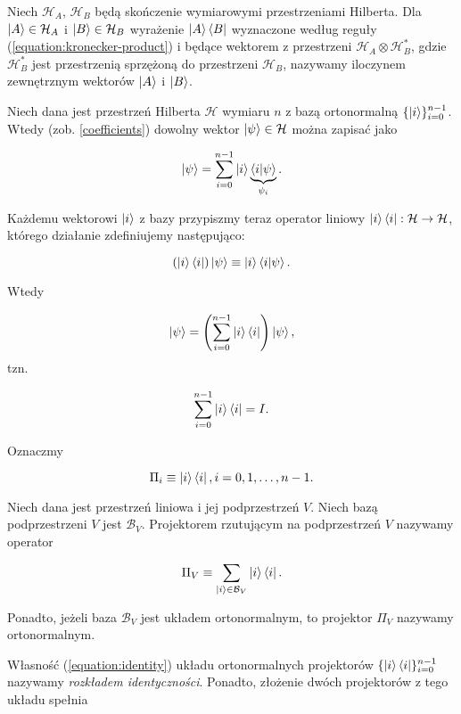 \begin{definition}
    Niech $\mathcal{H}_{A}$, $\mathcal{H}_{B}$ będą skończenie wymiarowymi przestrzeniami Hilberta. Dla $\ket{A} \in \mathcal{H}_A$ i $\ket{B} \in \mathcal{H}_B$ wyrażenie $\ket{A} \bra{B}$ wyznaczone według reguły (\ref{equation:kronecker-product}) i będące wektorem z przestrzeni $\mathcal{H}_A \otimes \mathcal{H}_{B} ^ {*}$, gdzie $\mathcal{H}_{B} ^ {*}$ jest przestrzenią sprzężoną do przestrzeni $\mathcal{H}_B$, nazywamy iloczynem zewnętrznym wektorów $\ket{A}$ i $\ket{B}$.
\end{definition}

Niech dana jest przestrzeń Hilberta $\mathcal{H}$ wymiaru $n$ z bazą ortonormalną $\{\ket{i}\}_{i = 0} ^ {n - 1}$. Wtedy (zob. \ref{coefficients}) dowolny wektor $\ket{\psi} \in \mathcal{H}$ można zapisać jako

$$
    \ket{\psi} = \sum\limits_{i = 0} ^ {n - 1} \ket{i} \underbrace{\bra{i}\ket{\psi}}_{\psi_{i}}.
$$

Każdemu wektorowi $\ket{i}$ z bazy przypiszmy teraz operator liniowy $\ket{i} \bra{i} : \mathcal{H} \rightarrow \mathcal{H}$, którego działanie zdefiniujemy następująco:

$$
    (\ket{i} \bra{i}) \ket{\psi} \equiv \ket{i} \bra{i}\ket{\psi}.
$$

Wtedy

$$
    \ket{\psi} = \left(\sum_{i = 0} ^ {n - 1} \ket{i} \bra{i} \right) \ket{\psi},
$$
tzn.

\begin{equation}
    \label{equation:identity}
    \sum\limits_{i = 0} ^ {n - 1} \ket{i} \bra{i} = I.
\end{equation}

Oznaczmy

$$
    \Pi_{i} \equiv \ket{i} \bra{i}, i = 0, 1, \ldots, n - 1.
$$

\begin{definition}
    Niech dana jest przestrzeń liniowa i jej podprzestrzeń $V$. Niech bazą podprzestrzeni $V$ jest $\mathcal{B}_{V}$. Projektorem rzutującym na podprzestrzeń $V$ nazywamy operator

    $$
        \Pi_V \equiv \sum\limits_{\ket{i} \in \mathcal{B}_V} \ket{i} \bra{i}.
    $$

    Ponadto, jeżeli baza $\mathcal{B}_V$ jest układem ortonormalnym, to projektor $\Pi_V$ nazywamy ortonormalnym.
\end{definition}

Własność (\ref{equation:identity}) układu ortonormalnych projektorów $\{\ket{i} \bra{i}\}_{i = 0} ^ {n - 1}$ nazywamy \textit{rozkładem identyczności}. Ponadto, złożenie dwóch projektorów z tego układu spełnia

